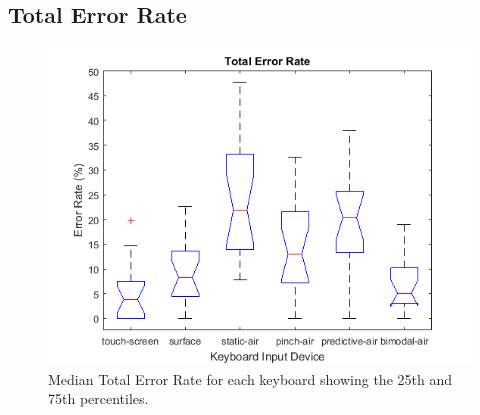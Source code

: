 \subsection{Total Error Rate}
\begin{figure}[h]
	\centering
	\includegraphics{fig_totER_boxplot}
	\caption[Total Error Rate Boxplot]{Median Total Error Rate for each keyboard showing the 25th and 75th percentiles.}
	\label{fig_totER_boxplot}
\end{figure}


